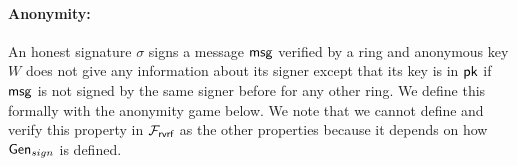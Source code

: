 	
	
	
	\paragraph{Anonymity:} An honest signature $ \sigma $ signs a message $ \mathsf{msg} $ verified by a ring and anonymous key $ W $ does not give any information about its signer except that its key is in $ \mathsf{pk} $ if $ \mathsf{msg} $ is not signed by the same signer before for any other ring. We define this formally with the anonymity game below. We note that we cannot define and verify this property in $ \mathcal{F}_{\textsf{rvrf}} $ as the other properties because it depends on how $ \mathsf{Gen}_{sign} $ is defined.
	
